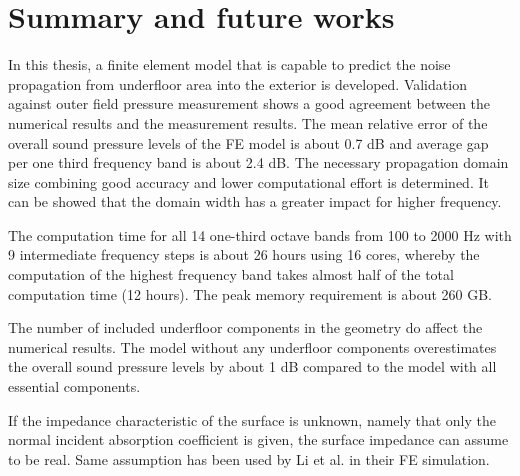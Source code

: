 \chapter{Summary and future works}

In this thesis, a finite element model that is capable to predict the noise propagation from underfloor area into the exterior is developed. Validation against outer field pressure measurement shows a good agreement between the numerical results and the measurement results. The mean relative error of the overall sound pressure levels of the FE model is about 0.7 dB and average gap per one third frequency band is about 2.4 dB. The necessary propagation domain size combining good accuracy and lower computational effort is determined. It can be showed that the domain width has a greater impact for higher frequency. 

The computation time for all 14 one-third octave bands from 100 to 2000 Hz with 9 intermediate frequency steps is about 26 hours using 16 cores, whereby the computation of the highest frequency band takes almost half of the total computation time (12 hours). The peak memory requirement is about 260 GB.


The number of included underfloor components in the geometry do affect the numerical results. The model without any underfloor components overestimates the overall sound pressure levels by about 1 dB compared to the model with all essential components.

If the impedance characteristic of the surface is unknown, namely that only the normal incident absorption coefficient is given, the surface impedance can assume to be real. Same assumption has been used by Li et al. \cite{li_25d_2021} in their FE simulation.